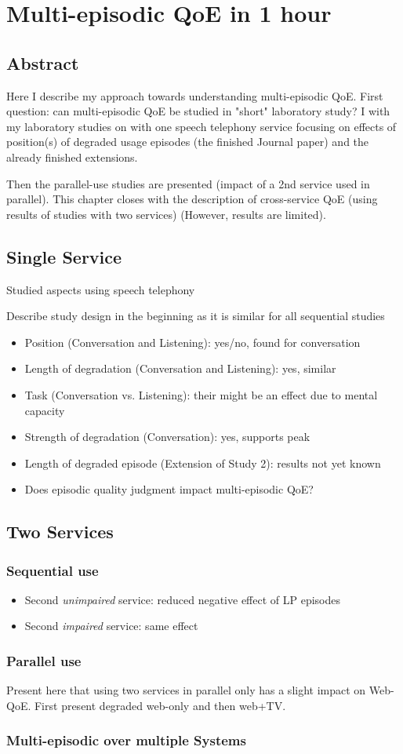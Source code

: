 \chapter{Multi-episodic QoE in 1 hour}\label{chap:06}
\section*{Abstract}
Here I describe my approach towards understanding multi-episodic QoE.
First question: can multi-episodic QoE be studied in "short" laboratory study?
I with my laboratory studies on with one speech telephony service focusing on effects of position(s) of degraded usage episodes (the finished Journal paper) and the already finished extensions.

Then the parallel-use studies are presented (impact of a 2nd service used in parallel).
This chapter closes with the description of cross-service QoE (using results of studies with two services) (However, results are limited).

\section{Single Service}
Studied aspects using speech telephony

Describe study design in the beginning as it is similar for all sequential studies

\begin{itemize}
\item Position (Conversation and Listening): yes/no, found for conversation
\item Length of degradation (Conversation and Listening): yes, similar
\item Task (Conversation vs. Listening): their might be an effect due to mental capacity
\item Strength of degradation (Conversation): yes, supports peak
\item Length of degraded episode (Extension of Study 2): results not yet known %
\item Does episodic quality judgment impact multi-episodic QoE? %
\end{itemize}

\section{Two Services}
\subsection{Sequential use}
\begin{itemize}
\item Second \textit{unimpaired} service: reduced negative effect of LP episodes
\item Second \textit{impaired} service: same effect
\end{itemize}

\subsection{Parallel use}
Present here that using two services in parallel only has a slight impact on Web-QoE.
First present degraded web-only and then web+TV.

\subsection{Multi-episodic over multiple Systems} %